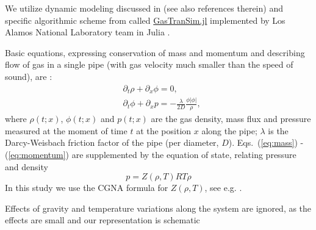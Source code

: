 We utilize dynamic modeling discussed in \cite{osiadacz_simulation_1984,steinbach_pde_2007,Chertkov2015Cascading} (see also references therein)  and specific algorithmic scheme from \cite{Gyrya2019AnExplicit} called \href{https://github.com/kaarthiksundar/GasTranSim.jl}{GasTranSim.jl} implemented by Los Alamos National Laboratory team in Julia \cite{GasTranSim}. 

Basic equations, expressing conservation of mass and momentum and  describing flow of gas in a single pipe (with gas velocity much smaller than the speed of sound), are  \cite{osiadacz_simulation_1984,steinbach_pde_2007}:
\begin{align}\label{eq:mass}
    & \partial_t \rho + \partial_x \phi = 0,\\ \label{eq:momentum}
    & \partial_t \phi + \partial_x p = -\frac{\lambda}{2D} \frac{\phi |\phi|}{\rho},
\end{align}
where $\rho(t;x)$, $\phi(t;x)$ and $p(t;x)$ are the gas density, mass flux and pressure measured at the moment of time $t$ at the position $x$ along the pipe; $\lambda$ is the Darcy-Weisbach friction factor of the pipe (per diameter, $D$).
Eqs.~(\ref{eq:mass}) -(\ref{eq:momentum}) are supplemented by the equation of state, relating pressure and density
\begin{equation}
    p = Z(\rho,T)RT\rho
\end{equation}
In this study we use the CGNA formula for $Z(\rho, T)$, see e.g. \cite{menon}.
\begin{comment}
\begin{gather}
\label{eq:state} p = Z RT\rho,
\end{gather}
where the compressibility factor, $Z$, dependent on temperature  is a function of temperature computed according to the standard CGNA formula \cite{menon}.
\end{comment} 
Effects of gravity and temperature variations along the system are ignored, as the effects are small and our representation is schematic
